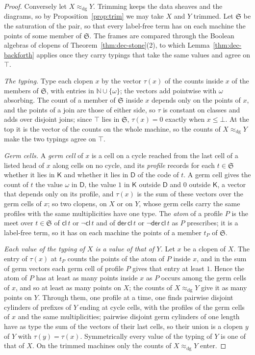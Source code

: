 \documentclass{lmcs}
\theoremstyle{definition}
\theoremstyle{remark}
\newcommand{\Nn}{\mathbb{N}}
\providecommand{\tcl}{\mathsf{cl}}
\providecommand{\tder}{\mathsf{der}}
\providecommand{\eqDg}{\approx_{\mathrm{dg}}}
\providecommand{\KK}{\mathsf{K}}
\providecommand{\DD}{\mathsf{D}}
\begin{document}
\begin{proof}
Conversely let $X\eqDg Y$. Trimming keeps the data sheaves and the diagrams, so by Proposition~\ref{prop:trim} we may
take $X$ and $Y$ trimmed. Let $\mathfrak S$ be the saturation of the pair, so that every label-free term has on each machine the points of some member of
$\mathfrak S$. The frames are compared through the Boolean algebras of
clopens of Theorem~\ref{thm:dec-stone}(2), to which Lemma~\ref{thm:dec-backforth} applies once they carry
typings that take the same values and agree on $\top$.

\emph{The typing.} Type each clopen $x$ by the vector $\tau(x)$ of the counts inside $x$ of the members of $\mathfrak S$, with
entries in $\Nn\cup\{\omega\}$; the vectors add pointwise with $\omega$ absorbing. The count of a
member of $\mathfrak S$ inside $x$ depends only on the points of $x$, and the points of a join are
those of either side, so $\tau$ is constant on classes and adds over disjoint joins; since
$\top$ lies in $\mathfrak S$, $\tau(x)=0$ exactly when $x\leq\bot$. At
the top it is the vector of the counts on the whole machine, so the counts of $X\eqDg Y$ make the two typings agree
on $\top$.

\emph{Germ cells.} A \emph{germ cell} of $x$ is a cell on a cycle reached from the last cell of a listed head of $x$
along cells on no cycle, and its \emph{profile} records for each $t\in \mathfrak S$ whether it lies in
$\KK$ and whether it lies in $\DD$ of the code of $t$. A germ cell gives the count of $t$ the
value $\omega$ in $\DD$, the value $1$ in $\KK$ outside $\DD$ and $0$ outside $\KK$, a vector that depends only on its
profile, and $\tau(x)$ is the sum of these vectors over the germ cells of $x$; so two clopens, on $X$ or on $Y$, whose germ cells carry the
same profiles with the same multiplicities have one type. The \emph{atom} of a profile $P$ is the meet over $t\in \mathfrak S$
of $\tcl\,t$ or $\neg\tcl\,t$ and of $\tder\,\tcl\,t$ or $\neg\tder\,\tcl\,t$ as $P$
prescribes; it is a label-free term, so it has on each machine the points of a member $t_P$ of
$\mathfrak S$.

\emph{Each value of the typing of $X$ is a value of that of $Y$.} Let $x$ be a clopen of $X$. The entry of $\tau(x)$
at $t_P$ counts the points of the atom of $P$ inside $x$, and in the sum of germ vectors each germ cell of profile $P$
gives that entry at least $1$. Hence the atom of $P$ has at least as many points inside $x$ as $P$ occurs among the
germ cells of $x$, and so at least as many points on $X$; the counts of $X\eqDg Y$ give it as
many points on $Y$. Through them, one profile at a time, one finds pairwise disjoint cylinders of prefixes of $Y$
ending at cycle cells, with the profiles of the germ cells of $x$ and the same multiplicities;
pairwise disjoint germ cylinders of one length have as type the sum of the vectors of their last cells, so their union
is a clopen $y$ of $Y$ with $\tau(y)=\tau(x)$. Symmetrically
every value of the typing of $Y$ is one of that of $X$. On the trimmed machines only the
counts of $X\eqDg Y$ enter.


\end{proof}
\end{document}
